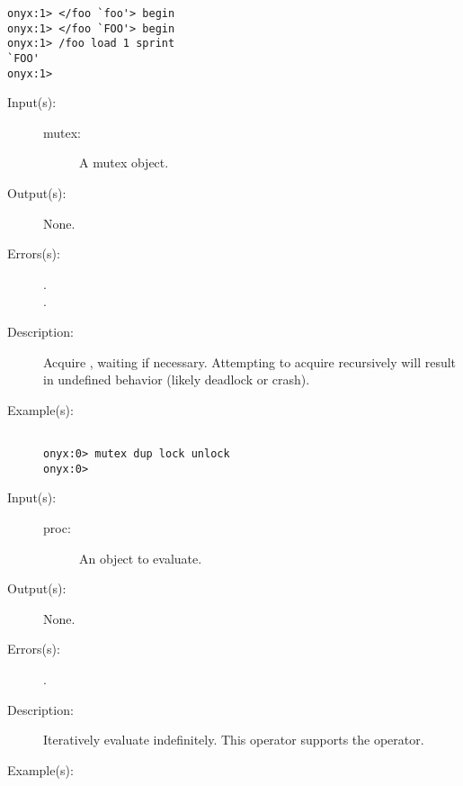 \begin{description}
\begin{description}
\begin{verbatim}
onyx:1> </foo `foo'> begin
onyx:1> </foo `FOO'> begin
onyx:1> /foo load 1 sprint
`FOO'
onyx:1>
		\end{verbatim}
	\end{description}
\label{systemdict:lock}
\item[{\onyxop{mutex}{lock}{--}}: ]
	\begin{description}\item[]
	\item[Input(s): ]
		\begin{description}\item[]
		\item[mutex: ]
			A mutex object.
		\end{description}
	\item[Output(s): ] None.
	\item[Errors(s): ]
		\begin{description}\item[]
		\item[.]
		\item[.]
		\end{description}
	\item[Description: ]
		Acquire , waiting if necessary.  Attempting to
		acquire  recursively will result in undefined
		behavior (likely deadlock or crash).
	\item[Example(s): ]\begin{verbatim}

onyx:0> mutex dup lock unlock
onyx:0>
		\end{verbatim}
	\end{description}
\label{systemdict:loop}
\item[{\onyxop{proc}{loop}{--}}: ]
	\begin{description}\item[]
	\item[Input(s): ]
		\begin{description}\item[]
		\item[proc: ]
			An object to evaluate.
		\end{description}
	\item[Output(s): ] None.
	\item[Errors(s): ]
		\begin{description}\item[]
		\item[.]
		\end{description}
	\item[Description: ]
		Iteratively evaluate  indefinitely.  This operator
		supports the 
		operator.
	\item[Example(s): ]\begin{verbatim}


\end{verbatim}
\end{description}
\end{description}
